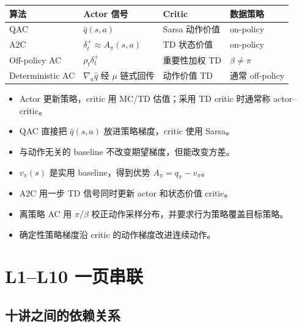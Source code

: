 \documentclass[11pt,a4paper,fontset=fandol]{ctexart}
\begin{document}
\begin{center}
\begin{tabularx}{\textwidth}{
  >{\raggedright\arraybackslash}p{}
  >{\raggedright\arraybackslash}p{}
  >{\raggedright\arraybackslash}p{} X}
\toprule
算法 & Actor 信号 & Critic & 数据策略\\
\midrule
QAC & \(\hat q(s,a)\) & Sarsa 动作价值 & on-policy\\
A2C & \(\delta_t^+\approx A_\pi(s,a)\) & TD 状态价值 & on-policy\\
Off-policy AC & \(\rho_t\delta_t^+\) & 重要性加权 TD & \(\beta\neq\pi\)\\
Deterministic AC & \(\nabla_a\hat q\) 经 \(\mu\) 链式回传 & 动作价值 TD & 通常 off-policy\\
\bottomrule
\end{tabularx}
\end{center}

\begin{memorybox}[L10 本章速记]
\begin{itemize}
  \item Actor 更新策略，critic 用 MC/TD 估值；采用 TD critic 时通常称 actor--critic。
  \item QAC 直接把 \(\hat q(s,a)\) 放进策略梯度，critic 使用 Sarsa。
  \item 与动作无关的 baseline 不改变期望梯度，但能改变方差。
  \item \(v_\pi(s)\) 是实用 baseline，得到优势
  \(A_\pi=q_\pi-v_\pi\)。
  \item A2C 用一步 TD 信号同时更新 actor 和状态价值 critic。
  \item 离策略 AC 用 \(\pi/\beta\) 校正动作采样分布，并要求行为策略覆盖目标策略。
  \item 确定性策略梯度沿 critic 的动作梯度改进连续动作。
\end{itemize}
\end{memorybox}

\clearpage
\section{L1--L10 一页串联}

\subsection*{十讲之间的依赖关系}
\end{document}
